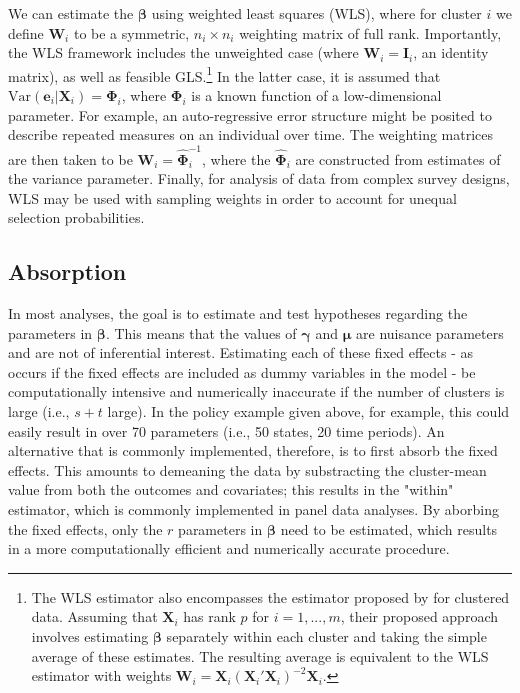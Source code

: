 \documentclass[12pt]{article}\usepackage[]{graphicx}\usepackage[]{color}
\newcommand{\Var}{\text{Var}}
\newcommand{\bm}{\mathbf}
\newcommand{\bs}{\boldsymbol}
\begin{document}
We can estimate the $\bs\beta$ using weighted least squares (WLS), where for cluster $i$ we define $\bm{W}_i$ to be a symmetric, $n_i \times n_i$ weighting matrix of full rank. 
Importantly, the WLS framework includes the unweighted case (where $\bm{W}_i = \bm{I}_i$, an identity matrix), as well as feasible GLS.\footnote{
The WLS estimator also encompasses the estimator proposed by \citet{Ibragimov2010tstatistic} for clustered data. 
Assuming that $\bm{X}_i$ has rank $p$ for $i = 1,...,m$, their proposed approach involves estimating $\bs\beta$ separately within each cluster and taking the simple average of these estimates. 
The resulting average is equivalent to the WLS estimator with weights $\bm{W}_i = \bm{X}_i \left(\bm{X}_i'\bm{X}_i\right)^{-2} \bm{X}_i$.} 
In the latter case, it is assumed that $\Var\left(\bm{e}_i\left|\bm{X}_i\right.\right) = \bs\Phi_i$, where $\bs\Phi_i$ is a known function of a low-dimensional parameter. 
For example, an auto-regressive error structure might be posited to describe repeated measures on an individual over time. 
The weighting matrices are then taken to be $\bm{W}_i = \hat{\bs\Phi}_i^{-1}$, where the $\hat{\bs\Phi}_i$ are constructed from estimates of the variance parameter.
Finally, for analysis of data from complex survey designs, WLS may be used with sampling weights in order to account for unequal selection probabilities.

\subsection{Absorption}

In most analyses, the goal is to estimate and test hypotheses regarding the parameters in $\bs\beta$. 
This means that the values of $\bs\gamma$ and $\bs\mu$ are nuisance parameters and are not of inferential interest. 
Estimating each of these fixed effects - as occurs if the fixed effects are included as dummy variables in the model - be computationally intensive and numerically inaccurate if the number of clusters is large (i.e., $s + t$ large). 
In the policy example given above, for example, this could easily result in over 70 parameters (i.e., 50 states, 20 time periods).
An alternative that is commonly implemented, therefore, is to first absorb the fixed effects. 
This amounts to demeaning the data by substracting the cluster-mean value from both the outcomes and covariates; this results in the "within" estimator, which is commonly implemented in panel data analyses. 
By aborbing the fixed effects, only the $r$ parameters in $\bs\beta$ need to be estimated, which results in a more computationally efficient and numerically accurate procedure. 
\end{document}

